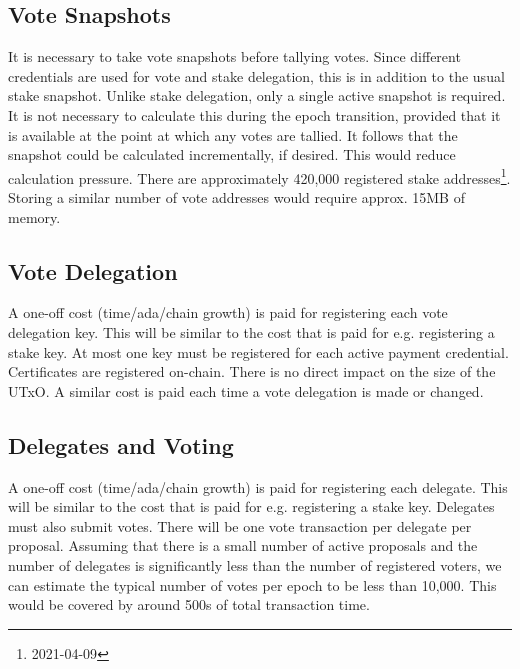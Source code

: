
\subsection{Vote Snapshots}

It is necessary to take vote snapshots before tallying votes.  Since different
credentials are used for vote and stake delegation, this is in addition to the
usual stake snapshot.  Unlike stake delegation, only a single active snapshot is required.
It is not necessary to calculate this during the epoch transition, provided that it is available
at the point at which any votes are tallied.  It follows that the snapshot could be calculated
incrementally, if desired.  This would reduce calculation pressure.  There are approximately 420,000
registered stake addresses\footnote{2021-04-09}.  Storing a similar number of vote addresses would require approx. 15MB of
memory.

\subsection{Vote Delegation}

A one-off cost (time/ada/chain growth) is paid for registering each vote delegation
key.  This will be similar to the cost that is paid for e.g. registering a stake key.
At most one key must be registered for each active payment credential.
Certificates are registered on-chain.  There is no direct impact on the size of
the UTxO.  A similar cost is paid each time a vote delegation is made or changed.

\subsection{Delegates and Voting}

A one-off cost (time/ada/chain growth) is paid for registering each delegate.
This will be similar to the cost that is paid for e.g. registering a stake key.
Delegates must also submit votes.  There will be one vote transaction per delegate per proposal.
Assuming that there is a small number of active proposals and the number of delegates is
significantly less than the number of registered voters, we can estimate the typical number of
votes per epoch to be less than 10,000. This would be covered by around 500s of total transaction time.

